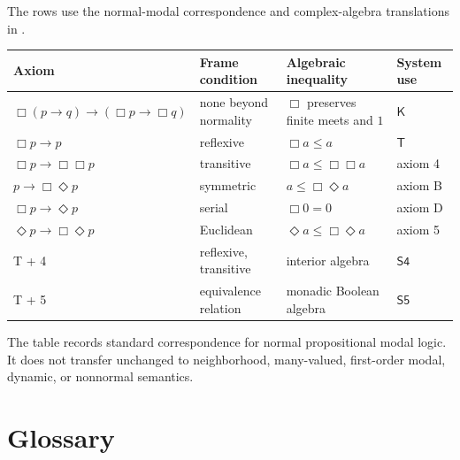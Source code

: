 The rows use the normal-modal correspondence and complex-algebra translations
in \cite{BlackburnDeRijkeVenema2001,Goldblatt1989}.

\begin{tabularx}{\textwidth}{@{}l l l X@{}}
\toprule
Axiom & Frame condition & Algebraic inequality & System use \\
\midrule
\(\Box(p\to q)\to(\Box p\to\Box q)\) & none beyond normality & \(\Box\) preserves finite meets and \(1\) & \(\mathsf K\) \\
\(\Box p\to p\) & reflexive & \(\Box a\le a\) & \(\mathsf T\) \\
\(\Box p\to\Box\Box p\) & transitive & \(\Box a\le\Box\Box a\) & axiom 4 \\
\(p\to\Box\Diamond p\) & symmetric & \(a\le\Box\Diamond a\) & axiom B \\
\(\Box p\to\Diamond p\) & serial & \(\Box0=0\) & axiom D \\
\(\Diamond p\to\Box\Diamond p\) & Euclidean & \(\Diamond a\le\Box\Diamond a\) & axiom 5 \\
T + 4 & reflexive, transitive & interior algebra & \(\mathsf{S4}\) \\
T + 5 & equivalence relation & monadic Boolean algebra & \(\mathsf{S5}\) \\
\bottomrule
\end{tabularx}

The table records standard correspondence for normal propositional modal
logic. It does not transfer unchanged to neighborhood, many-valued, first-order
modal, dynamic, or nonnormal semantics.

\section{Glossary}
\label{sec:p14-glossary}

